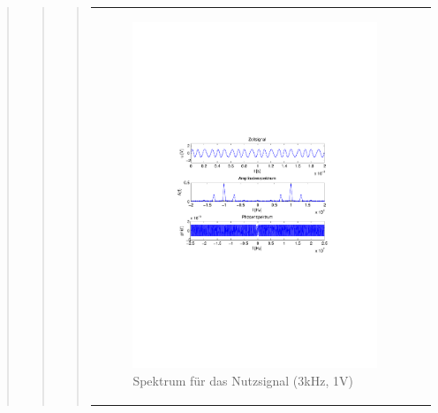 \begin{quote}
\begin{quote}
\begin{quote}
\begin{center}
\begin{tabular}{ll}
\begin{minipage}{0.6\textwidth}
                    \begin{figure}[H]
                        \includegraphics[scale=0.5, trim = 4cm 9.5cm 3.5cm
                        9.5cm, clip]{./Bilder/spektrum_sin3kHz}
               
                        \caption{Spektrum für das Nutzsignal (3kHz, 1V)}
                    \end{figure}

                \end{minipage}
                \begin{minipage}{0.6\textwidth}


\end{minipage}
\end{tabular}
\end{center}
\end{quote}
\end{quote}
\end{quote}
